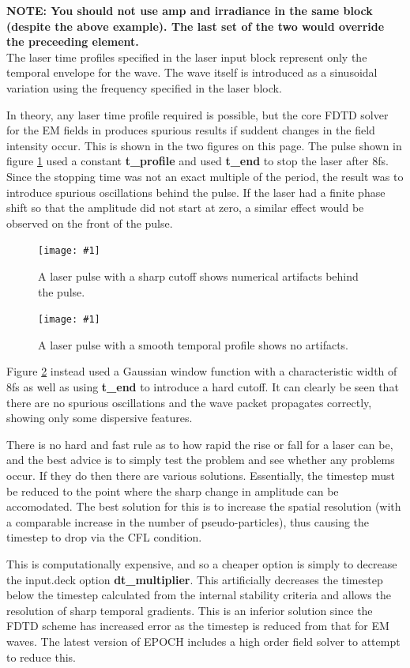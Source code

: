 \documentclass[12pt,a4paper]{article}
\newcommand{\emphtext}{\color{warwickdark} \fontfamily{phv}\selectfont\Large\bf}
\newcommand{\inlineemph}[1]{{\color{warwicklight} \bf{#1}}}
\newcommand{\EPOCH}{{\color{warwickdark}\fontfamily{phv}\selectfont{EPOCH}}}
\newcommand{\captionedimage}[3]
  {{\begin{figure}[hbt!]\centering\texttt{[image: \#1]}\caption{#3}\label{#2}
    \end{figure}}}
\begin{document}
{\emphtext NOTE: You should not use amp and irradiance in the same block
(despite the above example). The last set of the two would override the
preceeding element.}\\

The laser time profiles specified in the laser input block represent only the
temporal envelope for the wave. The wave itself is introduced as a sinusoidal
variation using the frequency specified in the laser block.

In theory, any laser time profile required is possible, but the core FDTD
solver for the EM fields in {\EPOCH} produces spurious results if suddent changes
in the field intensity occur. This is shown in the two figures on this
page. The pulse shown in figure \ref{badpulse} used a constant
\inlineemph{t\_profile} and used \inlineemph{t\_end} to stop the laser after
8fs. Since
the stopping time was not an exact multiple of the period, the result was to
introduce spurious oscillations behind the pulse. If the laser had a finite
phase shift so that the amplitude did not start at zero, a similar effect would
be observed on the front of the pulse.

\captionedimage{./images/pulse2}{badpulse}{A laser pulse with a sharp
cutoff shows numerical artifacts behind the pulse.}
\captionedimage{./images/pulse1}{smoothpulse}{A laser pulse with a smooth
temporal profile shows no artifacts.}

Figure \ref{smoothpulse} instead used a Gaussian window function with a
characteristic width of 8fs as well as using \inlineemph{t\_end} to introduce
a hard cutoff. It can clearly be seen that there are no spurious oscillations
and the wave packet propagates correctly, showing only some dispersive
features.

There is no hard and fast rule as to how rapid the rise or fall for a laser can
be, and the best advice is to simply test the problem and see whether any
problems occur. If they do then there are various solutions. Essentially, the
timestep must be reduced to the point where the sharp change in amplitude can
be accomodated. The best solution for this is to increase the spatial
resolution (with a comparable increase in the number of pseudo-particles), thus
causing the timestep to drop via the CFL condition.

This is computationally expensive, and so a cheaper option is simply to
decrease the input.deck option \inlineemph{dt\_multiplier}. This artificially
decreases the timestep below the timestep calculated from the internal
stability criteria and allows the resolution of sharp temporal gradients. This
is an inferior solution since the FDTD scheme has increased error as the
timestep is reduced from that for EM waves. The latest version of EPOCH
includes a high order field solver to attempt to reduce this.
\end{document}
